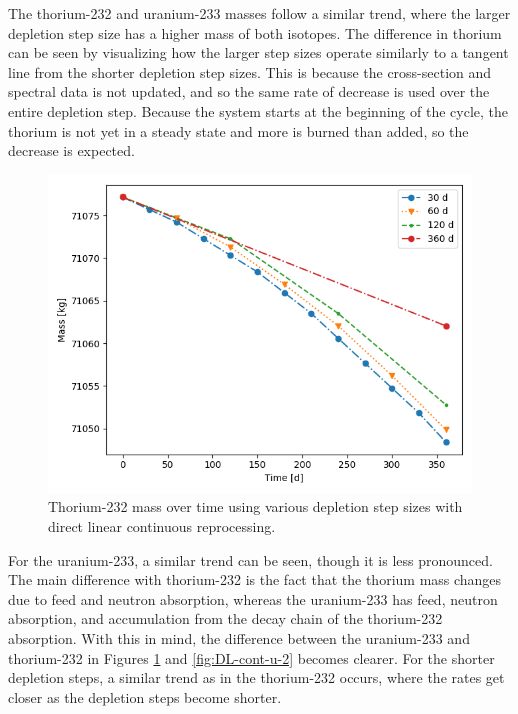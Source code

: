 The thorium-232 and uranium-233 masses follow a similar trend, where the larger depletion step size has a higher mass of both isotopes. The difference in thorium can be seen by visualizing how the larger step sizes operate similarly to a tangent line from the shorter depletion step sizes. This is because the cross-section and spectral data is not updated, and so the same rate of decrease is used over the entire depletion step. Because the system starts at the beginning of the cycle, the thorium is not yet in a steady state and more is burned than added, so the decrease is expected. 

\begin{figure}[H]
  \centering
  \includegraphics[scale=0.7]{images/DL_NSTEP_Th-232_mass-large.png}
  \caption{Thorium-232 mass over time using various depletion step sizes with direct linear continuous reprocessing.}
   \label{fig:DL-cont-th-2}
\end{figure}

For the uranium-233, a similar trend can be seen, though it is less pronounced. The main difference with thorium-232 is the fact that the thorium mass changes due to feed and neutron absorption, whereas the uranium-233 has feed, neutron absorption, and accumulation from the decay chain of the thorium-232 absorption. With this in mind, the difference between the uranium-233 and thorium-232 in Figures \ref{fig:DL-cont-th-2} and \ref{fig:DL-cont-u-2} becomes clearer. For the shorter depletion steps, a similar trend as in the thorium-232 occurs, where the rates get closer as the depletion steps become shorter.

